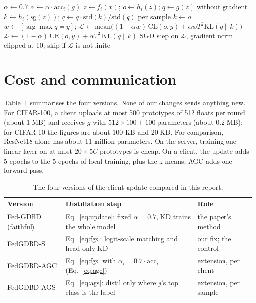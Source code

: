 \begin{algorithm}[H]
\caption{$\textsc{Update}(i, g)$: the client distillation step in all four versions}
\label{alg:update}
\begin{algorithmic}[1]
\State $\alpha \gets 0.7$ 
 $\alpha \gets \alpha \cdot \mathrm{acc}_i(g)$ 
\EndIf
{} 
  \State $z \gets f_i(x)$;\; $o \gets h_i(z)$;\; $q \gets g(z)$ without gradient 
   
    \State $k \gets h_i(\mathrm{sg}(z))$;\; $q \gets q \cdot \mathrm{std}(k)/\mathrm{std}(q)$ per sample 
  \Else \;\;$k \gets o$ 
  \EndIf
   
    \State $w \gets [\arg\max q = y]$;\; $\mathcal{L} \gets \mathrm{mean}\big((1-\alpha w)\,\mathrm{CE}(o,y) + \alpha w T^2 \mathrm{KL}(q \| k)\big)$
  \Else \;\;$\mathcal{L} \gets (1-\alpha)\,\mathrm{CE}(o,y) + \alpha T^2\, \mathrm{KL}(q \| k)$ 
  \EndIf
  \State SGD step on $\mathcal{L}$, gradient norm clipped at 10; skip if $\mathcal{L}$ is not finite 
\EndFor
\end{algorithmic}
\end{algorithm}

\section{Cost and communication}

Table~\ref{tab:versions} summarises the four versions. None of our changes sends anything new. For CIFAR-100, a client uploads at most 500 prototypes of 512 floats per round (about 1 MB) and receives $g$ with $512 \times 100 + 100$ parameters (about 0.2 MB); for CIFAR-10 the figures are about 100 KB and 20 KB. For comparison, ResNet18 alone has about 11 million parameters. On the server, training one linear layer on at most $20 \times 5C$ prototypes is cheap. On a client, the update adds 5 epochs to the 5 epochs of local training, plus the k-means; AGC adds one forward pass.

\begin{table}[htbp]
\centering
\caption[The four versions of the client update]{The four versions of the client update compared in this report.}
\label{tab:versions}
\small
\begin{tabularx}{\textwidth}{>{\raggedright\arraybackslash}p{3.2cm}>{\raggedright\arraybackslash}X>{\raggedright\arraybackslash}p{3.8cm}}
\toprule
Version & Distillation step & Role \\
\midrule
Fed-GDBD (faithful) & Eq.~\ref{eq:update}: fixed $\alpha=0.7$, KD trains the whole model & the paper's method \\
FedGDBD-S & Eq.~\ref{eq:fgs}: logit-scale matching and head-only KD & our fix; the control \\
FedGDBD-AGC & Eq.~\ref{eq:fgs} with $\alpha_i = 0.7\cdot\mathrm{acc}_i$ (Eq.~\ref{eq:agc}) & extension, per client \\
FedGDBD-AGS & Eq.~\ref{eq:ags}: distil only where $g$'s top class is the label & extension, per sample \\
\bottomrule
\end{tabularx}
\end{table}
